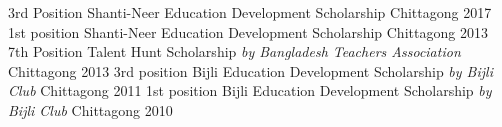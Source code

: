 


\begin{cvhonors}

  \cvhonor
    {3rd Position} %
    {
Shanti-Neer Education Development Scholarship} %
    {Chittagong} %
    {2017} %
  \cvhonor
    {1st position} %
    {
Shanti-Neer Education Development Scholarship} %
    {Chittagong} %
    {2013} %
  \cvhonor
    {7th Position} %
    {
Talent Hunt Scholarship \textit{by Bangladesh Teachers Association}} %
    {Chittagong} %
    {2013} %
  \cvhonor
    {3rd position} %
    {
Bijli Education Development Scholarship \textit{by Bijli Club}} %
    {Chittagong} %
    {2011} %
  \cvhonor
    {1st position} %
    {
Bijli Education Development Scholarship \textit{by Bijli Club}} %
    {Chittagong} %
    {2010} %
\end{cvhonors}
